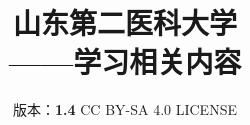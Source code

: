 

\title{%
    \normalsize
    \vspace{120pt}
    {\Huge\textbf{山东第二医科大学\\[5pt]——学习相关内容}}
}
\author{%
    版本：\textbf{1.4} \qquad%
    CC BY-SA 4.0 LICENSE \qquad%
    }
\date{\CurrentCustomTime}
\maketitle

\renewcommand{\thefootnote}{\arabic{footnote}}

\vspace{15ex}
